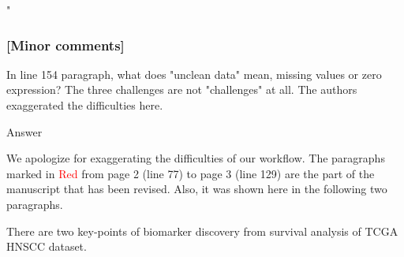 \documentclass[preprint,12pt]{elsarticle}
\newenvironment{MyColorPar}[1]{%
    \leavevmode\color{#1}\ignorespaces%
}{%
}%
\begin{document}
\begin{MyColorPar}{blue}
\begin{MyColorPar}{red}






%
"

\end{MyColorPar}


\begin{MyColorPar}{black} %
\subsubsection*{[Minor comments]}

In line 154 paragraph, what does "unclean data" mean, missing values or zero expression? 
The three challenges are not "challenges" at all. The authors exaggerated the difficulties here.\\[0.3cm]
\end{MyColorPar}

Answer

We apologize for exaggerating the difficulties of our workflow.
The paragraphs marked in \textcolor{red}{Red} from page 2 (line 77) to page 3 (line 129) are the part of the manuscript that has been revised. Also, it was shown here in the following two paragraphs.

\begin{MyColorPar}{red}
There are two key-points of biomarker discovery from survival analysis of TCGA HNSCC dataset.


\end{MyColorPar}
\end{MyColorPar}
\end{document}
